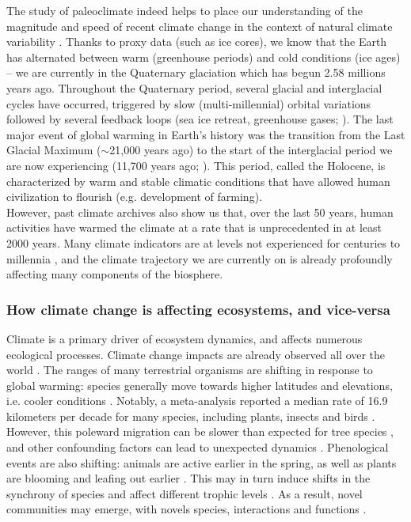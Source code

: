 The study of paleoclimate indeed helps to place our understanding of the magnitude and speed of recent climate change in the context of natural climate variability \citep{IPCC2021, Tierney2020}. Thanks to proxy data (such as ice cores), we know that the Earth has alternated between warm (greenhouse periods) and cold conditions (ice ages) -- we are currently in the Quaternary glaciation which has begun 2.58 millions years ago. Throughout the Quaternary period, several glacial and interglacial cycles have occurred, triggered by slow (multi-millennial) orbital variations followed by several feedback loops (sea ice retreat, greenhouse gases; \citealp{Snyder2016, Koehler2010}).
The last major event of global warming in Earth’s history was the transition from the Last Glacial Maximum ($\sim$21,000 years ago) to the start of the interglacial period we are now experiencing (11,700 years ago; ). 
This period, called the Holocene, is characterized by warm and stable climatic conditions that have allowed human civilization to flourish (e.g. development of farming). \\
However, past climate archives also show us that, over the last 50 years, human activities have warmed the climate at a rate that is unprecedented in at least 2000 years. Many climate indicators are at levels not experienced for centuries to millennia \citep{IPCC2021}, and the climate trajectory we are currently on is already profoundly affecting many components of the biosphere.

\subsubsection{How climate change is affecting ecosystems, and vice-versa} \label{sec:forest}

Climate is a primary driver of ecosystem dynamics, and affects numerous ecological processes. Climate change impacts are already observed all over the world \citep{IPCC2021}. The ranges of many terrestrial organisms are shifting in response to global warming: species generally move towards higher latitudes and elevations, i.e. cooler conditions \citep{Lenoir2008, Elmendorf2015, Pecl2017, Vitasse2021, Rumpf2018, Zurell2024}. Notably, a meta-analysis reported a median rate of 16.9 kilometers per decade for many species, including plants, insects and birds \citep{Chen2011}. However, this poleward migration can be slower than expected for tree species \citep{Harsch2009, Renwick2015}, and other confounding factors can lead to unexpected dynamics \citep{Lawlor2024}. Phenological events are also shifting: animals are active earlier in the spring, as well as plants are blooming and leafing out earlier \citep{Vitasse2021, Fu2015, Fu2019}. This may in turn induce shifts in the synchrony of species and affect different trophic levels \citep{Kharouba2018, Beard2019}. As a result, novel communities may emerge, with novels species, interactions and functions \citep{Hobbs2009, Radeloff2015, Ordonez2024}.

